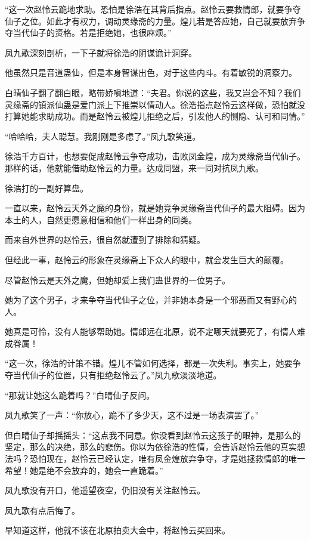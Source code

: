 \begin{this_body}
“这一次赵怜云跪地求助。恐怕是徐浩在其背后指点。赵怜云要救情郎，就要争夺仙子之位。如此才有权力，调动灵缘斋的力量。煌儿若是答应她，自己就要放弃争夺当代仙子的资格。若是拒绝她，也很麻烦。”

凤九歌深刻剖析，一下子就将徐浩的阴谋诡计洞穿。

他虽然只是音道蛊仙，但是本身智谋出色，对于这些内斗。有着敏锐的洞察力。

白晴仙子翻了翻白眼，略带娇嗔地道：“夫君。你说的这些，我又岂会不知？我们灵缘斋的镇派仙蛊是爱门派上下推崇以情动人。徐浩指点赵怜云这样做，恐怕就没打算她能求助成功。而是赵怜云被煌儿拒绝之后，引发他人的恻隐、认可和同情。”

“哈哈哈，夫人聪慧。我刚刚是多虑了。”凤九歌笑道。

徐浩千方百计，也想要促成赵怜云争夺成功，击败凤金煌，成为灵缘斋当代仙子。那样的话，他就能借助赵怜云的力量。达成同盟，来一同对抗凤九歌。

徐浩打的一副好算盘。

一直以来，赵怜云天外之魔的身份，就是她竞争灵缘斋当代仙子的最大阻碍。因为本土的人，自然更愿意相信和他们一样出身的同类。

而来自外世界的赵怜云，很自然就遭到了排除和猜疑。

但经此一事，赵怜云的形象在灵缘斋上下众人的眼中，就会发生巨大的颠覆。

尽管赵怜云是天外之魔，但她却爱上我们蛊世界的一位男子。

她为了这个男子，才来争夺当代仙子之位，并非她本身是一个邪恶而又有野心的人。

她真是可怜，没有人能够帮助她。情郎远在北原，说不定哪天就要死了，有情人难成眷属！

“这一次，徐浩的计策不错。煌儿不管如何选择，都是一次失利。事实上，她要争夺当代仙子的位置，只有拒绝赵怜云了。”凤九歌淡淡地道。

“那就让她这么跪着吗？”白晴仙子反问。

凤九歌笑了一声：“你放心，跪不了多少天，这不过是一场表演罢了。”

但白晴仙子却摇摇头：“这点我不同意。你没看到赵怜云这孩子的眼神，是那么的坚定，那么的决绝，那么的悲伤。你以为依徐浩的性情，会告诉赵怜云他的真实想法吗？恐怕现在，赵怜云已经认定，唯有凤金煌放弃争夺，才是她拯救情郎的唯一希望！她是绝不会放弃的，她会一直跪着。”

凤九歌没有开口，他遥望夜空，仍旧没有关注赵怜云。

凤九歌有点后悔了。

早知道这样，他就不该在北原拍卖大会中，将赵怜云买回来。


\end{this_body}
